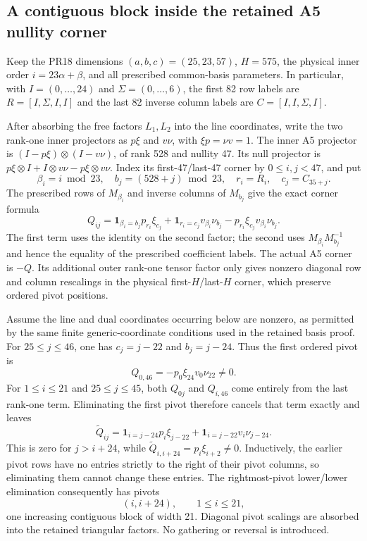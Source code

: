 \subsection{A contiguous block inside the retained A5 nullity corner}
Keep the PR18 dimensions $(a,b,c)=(25,23,57)$, $H=575$, the physical
inner order $i=23\alpha+\beta$, and all prescribed common-basis parameters.
In particular, with $I=(0,\ldots,24)$ and $\Sigma=(0,\ldots,6)$,
the first 82 row labels are $R=[I,\Sigma,I,I]$ and the last 82 inverse
column labels are $C=[I,I,\Sigma,I]$.

After absorbing the free factors $L_1,L_2$ into the line coordinates,
write the two rank-one inner projectors as $p\xi$ and $v\nu$, with
$\xi p=\nu v=1$. The inner A5 projector is
$(I-p\xi)\otimes(I-v\nu)$, of rank 528 and nullity 47. Its null
projector is $p\xi\otimes I+I\otimes v\nu-p\xi\otimes v\nu$.
Index its first-47/last-47 corner by $0\le i,j<47$, and put
\[
 \beta_i=i\bmod23,\quad b_j=(528+j)\bmod23,\quad
 r_i=R_i,\quad c_j=C_{35+j}.
\]
The prescribed rows of $M_{\beta_i}$ and inverse columns of $M_{b_j}$
give the exact corner formula
\[
 Q_{ij}=\mathbf1_{\beta_i=b_j}p_{r_i}\xi_{c_j}
       +\mathbf1_{r_i=c_j}v_{\beta_i}\nu_{b_j}
       -p_{r_i}\xi_{c_j}v_{\beta_i}\nu_{b_j}.
\]
The first term uses the identity on the second factor; the second uses
$M_{\beta_i}M_{b_j}^{-1}$ and hence the equality of the prescribed
coefficient labels. The actual A5 corner is $-Q$. Its additional outer
rank-one tensor factor only gives nonzero diagonal row and column
rescalings in the physical first-$H$/last-$H$ corner, which preserve
ordered pivot positions.

Assume the line and dual coordinates occurring below are nonzero, as
permitted by the same finite generic-coordinate conditions used in the
retained basis proof. For $25\le j\le46$, one has
$c_j=j-22$ and $b_j=j-24$. Thus the first ordered pivot is
\[
 Q_{0,46}=-p_0\xi_{24}v_0\nu_{22}\ne0.
\]
For $1\le i\le21$ and $25\le j\le45$, both $Q_{0j}$ and $Q_{i,46}$
come entirely from the last rank-one term. Eliminating the first pivot
therefore cancels that term exactly and leaves
\[
 \widetilde Q_{ij}
 =\mathbf1_{i=j-24}p_i\xi_{j-22}
  +\mathbf1_{i=j-22}v_i\nu_{j-24}.
\]
This is zero for $j>i+24$, while
$\widetilde Q_{i,i+24}=p_i\xi_{i+2}\ne0$.
Inductively, the earlier pivot rows have no entries strictly to the right
of their pivot columns, so eliminating them cannot change these entries.
The rightmost-pivot lower/lower elimination consequently has pivots
\[
 (i,i+24),\qquad 1\le i\le21,
\]
one increasing contiguous block of width 21. Diagonal pivot scalings are
absorbed into the retained triangular factors. No gathering or reversal
is introduced.


